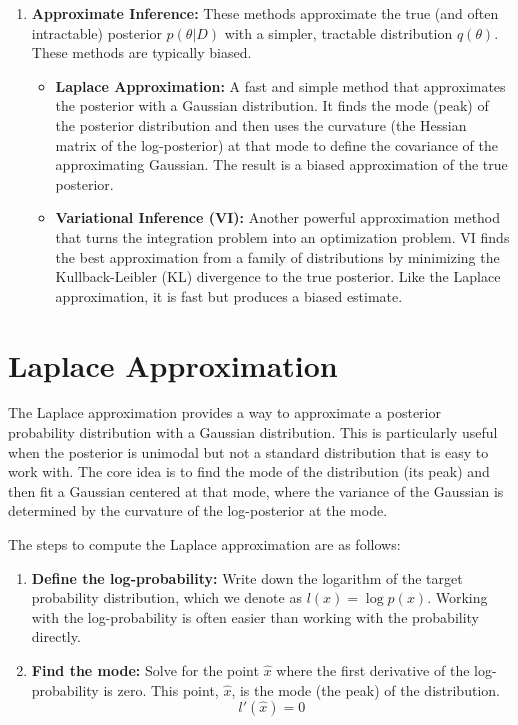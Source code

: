 \documentclass{article}
\begin{document}
\begin{multicols}{2}
\begin{enumerate}
		\item \textbf{Approximate Inference:} These methods approximate the true (and often intractable) posterior $p(\theta|D)$ with a simpler, tractable distribution $q(\theta)$. These methods are typically biased.
		      \begin{itemize}
			      \item \textbf{Laplace Approximation:} A fast and simple method that approximates the posterior with a Gaussian distribution. It finds the mode (peak) of the posterior distribution and then uses the curvature (the Hessian matrix of the log-posterior) at that mode to define the covariance of the approximating Gaussian. The result is a biased approximation of the true posterior.

			      \item \textbf{Variational Inference (VI):} Another powerful approximation method that turns the integration problem into an optimization problem. VI finds the best approximation from a family of distributions by minimizing the Kullback-Leibler (KL) divergence to the true posterior. Like the Laplace approximation, it is fast but produces a biased estimate.
		      \end{itemize}
	\end{enumerate}


	\section{Laplace Approximation}

	The Laplace approximation provides a way to approximate a posterior probability distribution with a Gaussian distribution. This is particularly useful when the posterior is unimodal but not a standard distribution that is easy to work with. The core idea is to find the mode of the distribution (its peak) and then fit a Gaussian centered at that mode, where the variance of the Gaussian is determined by the curvature of the log-posterior at the mode.

	The steps to compute the Laplace approximation are as follows:

	\begin{enumerate}
		\item \textbf{Define the log-probability:}
		      Write down the logarithm of the target probability distribution, which we denote as $l(x) = \log p(x)$. Working with the log-probability is often easier than working with the probability directly.

		\item \textbf{Find the mode:}
		      Solve for the point $\hat{x}$ where the first derivative of the log-probability is zero. This point, $\hat{x}$, is the mode (the peak) of the distribution.
		      $$ l'(\hat{x}) = 0 $$


\end{enumerate}
\end{multicols}
\end{document}
